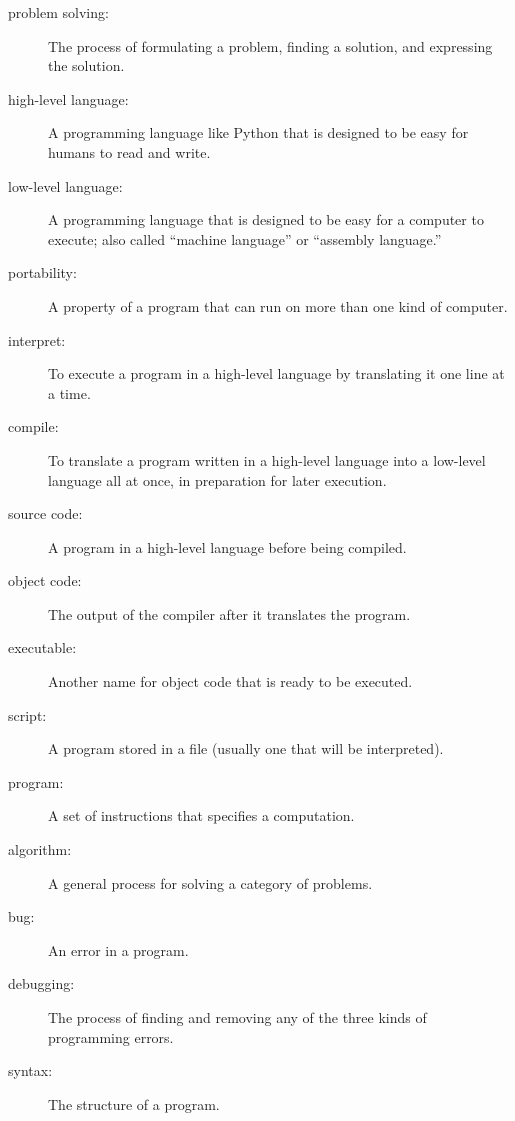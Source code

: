 \begin{description}

\item[problem solving:]  The process of formulating a problem, finding
a solution, and expressing the solution.

\item[high-level language:]  A programming language like Python that
is designed to be easy for humans to read and write.

\item[low-level language:]  A programming language that is designed
to be easy for a computer to execute; also called ``machine language'' or
``assembly language.''

\item[portability:]  A property of a program that can run on more
than one kind of computer.

\item[interpret:]  To execute a program in a high-level language
by translating it one line at a time.

\item[compile:]  To translate a program written in a high-level language
into a low-level language all at once, in preparation for later
execution.

\item[source code:]  A program in a high-level language before
being compiled.

\item[object code:]  The output of the compiler after it translates
the program.

\item[executable:]  Another name for object code that is ready
to be executed.

\item[script:] A program stored in a file (usually one that will be
interpreted).

\item[program:] A set of instructions that specifies a computation.

\item[algorithm:]  A general process for solving a category of
problems.

\item[bug:]  An error in a program.

\item[debugging:]  The process of finding and removing any of the
three kinds of programming errors.

\item[syntax:]  The structure of a program.


\end{description}

